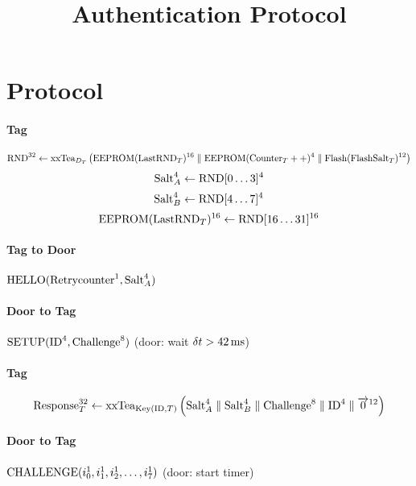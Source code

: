 \documentclass[a4paper,10pt]{scrartcl}
\title{\openbouncer{} Authentication Protocol}
\author{}
\begin{document}
\maketitle

\begin{abstract}

\end{abstract}

\section{Protocol}

\paragraph{Tag} $$\textnormal{RND}^{32} \leftarrow \textnormal{xxTea}_{D_T}\left(\textnormal{EEPROM}(\textnormal{LastRND}_T)^{16} \parallel \textnormal{EEPROM}(\textnormal{Counter}_T++)^{4} \parallel \textnormal{Flash}(\textnormal{FlashSalt}_T)^{12} \right)$$
$$\textnormal{Salt}_A^{4} \leftarrow \textnormal{RND}[0\ldots3]^{4}$$
$$\textnormal{Salt}_B^{4} \leftarrow \textnormal{RND}[4\ldots7]^{4}$$
$$\textnormal{EEPROM}(\textnormal{LastRND}_T)^{16} \leftarrow \textnormal{RND}[16\ldots31]^{16}$$

\paragraph{Tag to Door} $\textnormal{HELLO}(\textnormal{Retrycounter}^1,\textnormal{Salt}_A^{4})$

\paragraph{Door to Tag} $\textnormal{SETUP}(\textnormal{ID}^{4}, \textnormal{Challenge}^{8})$
(door: wait $\delta t > 42\,\textnormal{ms}$)

\paragraph{Tag} $$\textnormal{Response}_T^{32} \leftarrow \textnormal{xxTea}_{\textnormal{\scriptsize{Key}}(\textnormal{\scriptsize{ID}},T)}\left( \textnormal{Salt}_A^4 \parallel \textnormal{Salt}_B^4 \parallel \textnormal{Challenge}^8 \parallel \textnormal{ID}^4 \parallel \overrightarrow{0}^{12} \right)$$

\paragraph{Door to Tag} $\textnormal{CHALLENGE}(i_0^1, i_1^1, i_2^1, \ldots, i_7^1)$
(door: start timer)
\end{document}
